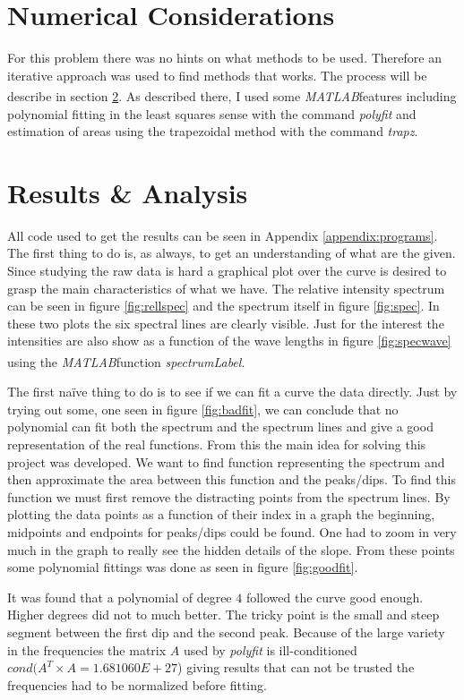 \documentclass[10pt, a4paper]{article}
\newcommand{\matlab}{\small{\emph{MATLAB\textsuperscript{\textregistered}}}}
\begin{document}
\section{Numerical Considerations}
For this problem there was no hints on what methods to be used. Therefore an iterative approach was used to find methods that works. The process will be describe in section \ref{sec:result}. As described there, I used some \matlab features including polynomial fitting in the least squares sense with the command \emph{polyfit} and estimation of areas using the trapezoidal method with the command \emph{trapz}.

\section{Results \& Analysis} \label{sec:result}
All code used to get the results can be seen in Appendix \ref{appendix:programs}. The first thing to do is, as always, to get an understanding of what are the given. Since studying the raw data is hard a graphical plot over the curve is desired to grasp the main characteristics of what we have. The relative intensity spectrum can be seen in figure \ref{fig:rellspec} and the spectrum itself in figure \ref{fig:spec}. In these two plots the six spectral lines are clearly visible. Just for the interest the intensities are also show as a function of the wave lengths in figure \ref{fig:specwave} using the \matlab function \emph{spectrumLabel}\cite{spectrumLabel}.

The first na\"{i}ve thing to do is to see if we can fit a curve the data directly. Just by trying out some, one seen in figure \ref{fig:badfit}, we can conclude that no polynomial can fit both the spectrum and the spectrum lines and give a good representation of the real functions. From this the main idea for solving this project was developed. We want to find function representing the spectrum  and then approximate the area between this function and the peaks/dips. To find this function we must first remove the distracting points from the spectrum lines. By plotting the data points as a function of their index in a graph the beginning, midpoints and endpoints for peaks/dips could be found. One had to zoom in very much in the graph to really see the hidden details of the slope. From these points some polynomial fittings was done as seen in figure \ref{fig:goodfit}.

It was found that a polynomial of degree $4$ followed the curve good enough. Higher degrees did not to much better. The tricky point is the small and steep segment between the first dip and the second peak. Because of the large variety in the frequencies the matrix $A$ used by \emph{polyfit} is ill-conditioned $cond(A^T\times A=1.681060E+27$) giving results that can not be trusted the frequencies had to be normalized before fitting. %
\end{document}

